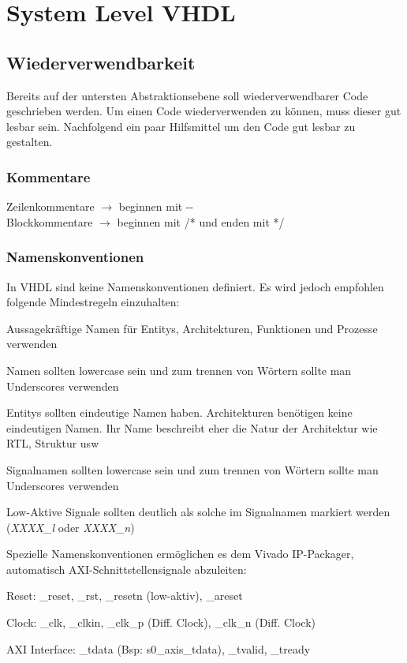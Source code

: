 \section{System Level VHDL}
\subsection{Wiederverwendbarkeit}
Bereits auf der untersten Abstraktionsebene soll wiederverwendbarer Code geschrieben werden. Um einen Code wiederverwenden zu können, muss dieser gut lesbar sein. Nachfolgend ein paar Hilfsmittel um den Code gut lesbar zu gestalten.
\subsubsection{Kommentare}
Zeilenkommentare $\rightarrow$ beginnen mit -{}-\\
Blockkommentare $\rightarrow$ beginnen mit /* und enden mit */
\subsubsection{Namenskonventionen}
In VHDL sind keine Namenskonventionen definiert. Es wird jedoch empfohlen folgende Mindestregeln einzuhalten: 
\begin{compactitem}
    \item Aussagekräftige Namen für Entitys, Architekturen, Funktionen und Prozesse verwenden
    \item Namen sollten lowercase sein und zum trennen von Wörtern sollte man Underscores verwenden
    \item Entitys sollten eindeutige Namen haben. Architekturen benötigen keine eindeutigen Namen. Ihr Name beschreibt eher die Natur der Architektur wie RTL, Struktur usw
    \item Signalnamen sollten lowercase sein und zum trennen von Wörtern sollte man Underscores verwenden 
    \item Low-Aktive Signale sollten deutlich als solche im Signalnamen markiert werden (\textit{XXXX\_l} oder \textit{XXXX\_n})
\end{compactitem}
Spezielle Namenskonventionen ermöglichen es dem Vivado IP-Packager, automatisch AXI-Schnittstellensignale abzuleiten: 
\begin{compactitem}
    \item Reset: \_reset, \_rst, \_resetn (low-aktiv), \_areset 
    \item Clock: \_clk, \_clkin, \_clk\_p (Diff. Clock), \_clk\_n (Diff. Clock)
    \item AXI Interface: \_tdata (Bsp: s0\_axis\_tdata), \_tvalid, \_tready
\end{compactitem}
